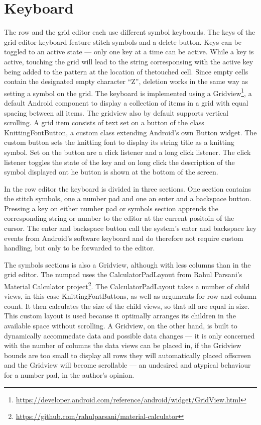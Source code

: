 \section{Keyboard}
The row and the grid editor each use different symbol keyboards. The keys of the grid editor keyboard feature stitch symbols and a delete button. Keys can be toggled to an active state --- only one key at a time can be active. While a key is active, touching the grid will lead to the string corresponsing with the active key being added to the pattern at the location of thetouched cell. Since empty cells contain the designated empty character ``Z'', deletion works in the same way as setting a symbol on the grid. The keyboard is implemented using a Gridview\footnote{\url{https://developer.android.com/reference/android/widget/GridView.html}}, a default Android component to display a collection of items in a grid with equal spacing between all items. The gridview also by default supports vertical scrolling. A grid item consists of text set on a button of the class KnittingFontButton, a custom class extending Android’s own Button widget. The custom button sets the knitting font to display its string title as a knitting symbol. Set on the button are a click listener and a long click listener. The click listener toggles the state of the key and on long click the description of the symbol displayed ont he button is shown at the bottom of the screen.

In the row editor the keyboard is divided in three sections. One section contains the stitch symbols, one a number pad and one an enter and a backspace button. Pressing a key on either number pad or symbols section apprends the corresponding string or number to the editor at the current positoin of the cursor. The enter and backspace button call the system’s enter and backspace key events from Android’s software keyboard and do therefore not require custom handling, but only to be forwarded to the editor.

The symbols sections is also a Gridview, although with less columns than in the grid editor. The numpad uses the CalculatorPadLayout from Rahul Parsani's Material Calculator project\footnote{\url{https://github.com/rahulparsani/material-calculator}}. The CalculatorPadLayout takes a number of child views, in this case KnittingFontButtons, as well as arguments for row and column count. It then calculates the size of the child views, so that all are equal in size. This custom layout is used because it optimally arranges its children in the available space without scrolling. A Gridview, on the other hand, is built to dynamically accommedate data and possible data changes --- it is only concerned with the number of columns the data views can be placed in, if the Gridview bounds are too small to display all rows they will automatically placed offscreen and the Gridview will become scrollable --- an undesired and atypical behaviour for a number pad, in the author's opinion.

